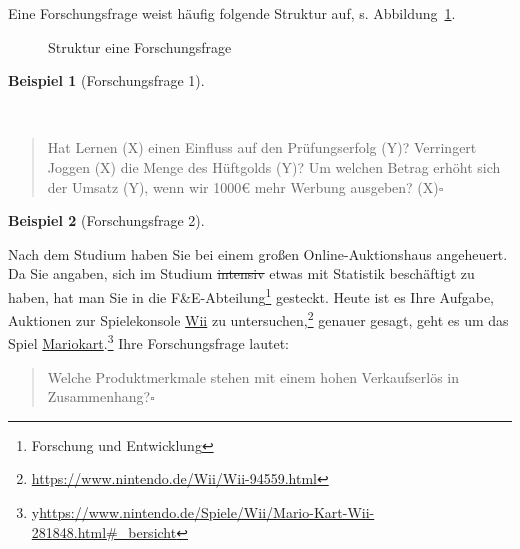 \documentclass[
  a4paper,
  DIV=11]{scrreprt}
\theoremstyle{definition}
\theoremstyle{definition}
\newtheorem{example}{Beispiel}[chapter]
\theoremstyle{definition}
\theoremstyle{remark}
\begin{document}
Eine Forschungsfrage weist häufig folgende Struktur auf, s.
Abbildung~\ref{fig-fo-struktur}.

\begin{figure}


\caption{\label{fig-fo-struktur}Struktur eine Forschungsfrage}

\end{figure}%

\begin{example}[Forschungsfrage
1]\protect\hypertarget{exm-fofrage1}{}\label{exm-fofrage1}

~

\begin{quote}
Hat Lernen (X) einen Einfluss auf den Prüfungserfolg (Y)? Verringert
Joggen (X) die Menge des Hüftgolds (Y)? Um welchen Betrag erhöht sich
der Umsatz (Y), wenn wir 1000€ mehr Werbung ausgeben? (X)\(\square\)
\end{quote}

\end{example}

\begin{example}[Forschungsfrage
2]\protect\hypertarget{exm-fofrage2}{}\label{exm-fofrage2}

Nach dem Studium haben Sie bei einem großen Online-Auktionshaus
angeheuert. Da Sie angaben, sich im Studium \st{intensiv} etwas mit
Statistik beschäftigt zu haben, hat man Sie in die
F\&E-Abteilung\footnote{Forschung und Entwicklung} gesteckt. Heute ist
es Ihre Aufgabe, Auktionen zur Spielekonsole
\href{https://www.nintendo.de/Wii/Wii-94559.html}{Wii} zu
untersuchen,\footnote{\url{https://www.nintendo.de/Wii/Wii-94559.html}}
genauer gesagt, geht es um das Spiel
\href{https://www.nintendo.de/Spiele/Wii/Mario-Kart-Wii-281848.html\#_bersicht}{Mariokart}.\footnote{y\url{https://www.nintendo.de/Spiele/Wii/Mario-Kart-Wii-281848.html\#_bersicht}}
Ihre Forschungsfrage lautet:

\begin{quote}
Welche Produktmerkmale stehen mit einem hohen Verkaufserlös in
Zusammenhang?\(\square\)
\end{quote}

\end{example}
\end{document}
